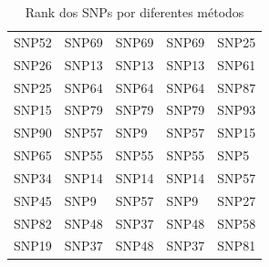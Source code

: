 \begin{table}[ht]
\begin{tabular}{lllll}
  SNP52 & SNP69 & SNP69 & SNP69 & SNP25 \\ 
  SNP26 & SNP13 & SNP13 & SNP13 & SNP61 \\ 
  SNP25 & SNP64 & SNP64 & SNP64 & SNP87 \\ 
  SNP15 & SNP79 & SNP79 & SNP79 & SNP93 \\ 
  SNP90 & SNP57 & SNP9 & SNP57 & SNP15 \\ 
  SNP65 & SNP55 & SNP55 & SNP55 & SNP5 \\ 
  SNP34 & SNP14 & SNP14 & SNP14 & SNP57 \\ 
  SNP45 & SNP9 & SNP57 & SNP9 & SNP27 \\ 
  SNP82 & SNP48 & SNP37 & SNP48 & SNP58 \\ 
  SNP19 & SNP37 & SNP48 & SNP37 & SNP81 \\ 
   \hline
\end{tabular}
\caption{Rank dos SNPs por diferentes métodos} 
\label{tab:ranks}
\end{table}
